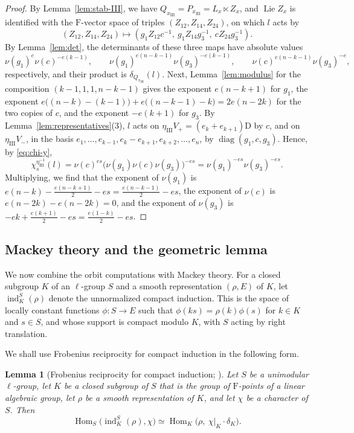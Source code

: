\documentclass[11pt]{amsart}
\numberwithin{equation}{section}
\theoremstyle{plain}
\newtheorem{lemma}[theorem]{Lemma}
\theoremstyle{definition}
\theoremstyle{remark}
\DeclareMathOperator{\Hom}{Hom}
\DeclareMathOperator{\ind}{ind}
\DeclareMathOperator{\Lie}{Lie}
\DeclareMathOperator{\diag}{diag}
\begin{document}
\begin{proof}
	By Lemma~\ref{lem:stab-III}, we have $Q_{x_{\mathrm{III}}}=P_{x_{\mathrm{III}}}=L_x\ltimes Z_x$, and $\Lie Z_x$ is identified with the $\mathrm{F}$-vector space of triples $(Z_{12},Z_{14},Z_{24})$, on which $l$ acts by
	$$
	(Z_{12},Z_{14},Z_{24})\longmapsto(g_1Z_{12}c^{-1},\ g_1Z_{14}g_3^{-1},\ cZ_{24}g_3^{-1}).
	$$
	By Lemma~\ref{lem:det}, the determinants of these three maps have absolute values
	$$
	\nu(g_1)^{e}\nu(c)^{-e(k-1)},\qquad\nu(g_1)^{e(n-k-1)}\nu(g_3)^{-e(k-1)},\qquad\nu(c)^{e(n-k-1)}\nu(g_3)^{-e},
	$$
	respectively, and their product is $\delta_{Q_{x_{\mathrm{III}}}}(l)$. Next, Lemma~\ref{lem:modulus} for the composition $(k-1,1,1,n-k-1)$ gives the exponent $e(n-k+1)$ for $g_1$, the exponent $e\big((n-k)-(k-1)\big)+e\big((n-k-1)-k\big)=2e(n-2k)$ for the two copies of $c$, and the exponent $-e(k+1)$ for $g_3$. By Lemma~\ref{lem:representatives}(3), $l$ acts on $\eta_{\mathrm{III}}V_+=(e_k+e_{k+1})\mathrm{D}$ by $c$, and on $\eta_{\mathrm{III}}V_-$, in the basis $e_1,\dots,e_{k-1},e_k-e_{k+1},e_{k+2},\dots,e_n$, by $\diag(g_1,c,g_3)$. Hence, by \eqref{eq:chi-y},
	$$
	\chi_s^{\eta_{\mathrm{III}}^{-1}}(l)=\nu(c)^{es}\big(\nu(g_1)\nu(c)\nu(g_3)\big)^{-es}=\nu(g_1)^{-es}\nu(g_3)^{-es}.
	$$
	Multiplying, we find that the exponent of $\nu(g_1)$ is $e(n-k)-\frac{e(n-k+1)}2-es=\frac{e(n-k-1)}2-es$, the exponent of $\nu(c)$ is $e(n-2k)-e(n-2k)=0$, and the exponent of $\nu(g_3)$ is $-ek+\frac{e(k+1)}2-es=\frac{e(1-k)}2-es$.
\end{proof}

\subsection{Mackey theory and the geometric lemma}\label{ss:mackey}

We now combine the orbit computations with Mackey theory. For a closed subgroup $K$ of an $\ell$-group $S$ and a smooth representation $(\rho,E)$ of $K$, let $\ind_K^S(\rho)$ denote the unnormalized compact induction. This is the space of locally constant functions $\phi\colon S\to E$ such that $\phi(ks)=\rho(k)\phi(s)$ for $k\in K$ and $s\in S$, and whose support is compact modulo $K$, with $S$ acting by right translation.

We shall use Frobenius reciprocity for compact induction in the following form.

\begin{lemma}[Frobenius reciprocity for compact induction; {\cite[Proposition 2.29]{BZ76}}]\label{lem:frob-compact}
	Let $S$ be a unimodular $\ell$-group, let $K$ be a closed subgroup of $S$ that is the group of $\mathrm{F}$-points of a linear algebraic group, let $\rho$ be a smooth representation of $K$, and let $\chi$ be a character of $S$. Then
	$$
	\Hom_S\big(\ind_K^S(\rho),\chi\big)\simeq\Hom_K\big(\rho,\ \chi|_K\cdot\delta_K\big).
	$$
\end{lemma}
\end{document}
